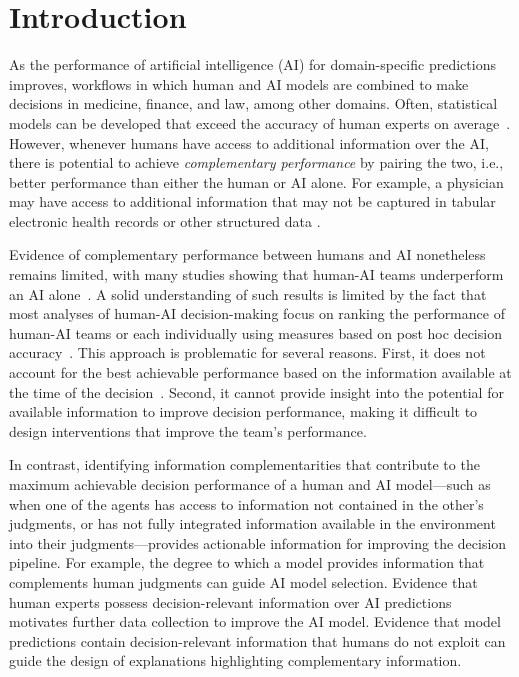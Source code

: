 
\section{Introduction}
\mvspace{-2mm}
As the performance of artificial intelligence (AI) for domain-specific predictions improves, workflows in which human and AI models are combined to make decisions in medicine, finance, and law, among other domains. 
Often, statistical models can be developed that exceed the accuracy of human experts on average~\citep{aegisdottir2006meta,grove2000clinical,meehl1954clinical}. 
However, whenever humans have access to additional information over the AI, there is potential to achieve \textit{complementary performance} by pairing the two, i.e., better performance than either the human or AI alone.
For example, a physician may have access to additional information that may not be captured in tabular electronic health records or other structured data \citep{alur2024distinguishing}. 


Evidence of complementary performance between humans and AI nonetheless remains limited, with many studies showing that human-AI teams underperform an AI alone~\citep{buccinca2020proxy, bussone2015role, green2019principles, jacobs2021machine, lai2019human, vaccaro2019effects, kononenko2001machine}.
A solid understanding of such results is limited by the fact that most analyses of human-AI decision-making focus on ranking the performance of human-AI teams or each individually using measures based on post hoc decision accuracy~\citep{passi2022overreliance}. This approach is problematic for several reasons. First, it does not account for the best achievable performance based on the information available at the time of the decision~\citep{kleinberg2015prediction, guo2024decision, rambachan2024identifying}. 
Second, it cannot provide insight into the 
potential for available information to improve decision performance, making it difficult to design interventions that improve the team's performance. 


In contrast, identifying information complementarities that contribute to the maximum achievable decision performance of a human and AI model---such as when one of the agents has access to information not contained in the other's judgments, or has not fully integrated information available in the environment into their judgments---provides actionable information for improving the decision pipeline. For example, the degree to which a model provides information that complements human judgments can guide AI model selection. 
Evidence that human experts possess decision-relevant information over AI predictions motivates further data collection to improve the AI model. 
Evidence that model predictions contain decision-relevant information that humans do not exploit can guide the design of explanations highlighting complementary information.


